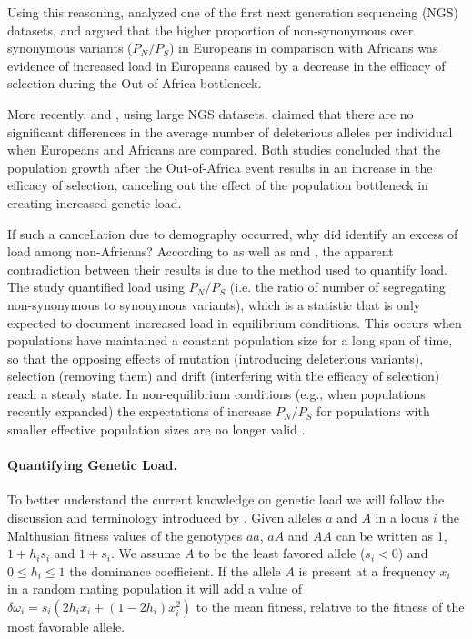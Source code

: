 \documentclass[a4paper, 12pt]{article}
\begin{document}
Using this reasoning, \cite{Lohmueller2008} analyzed one of the first next
generation sequencing (NGS) datasets, and argued that the higher proportion of
non-synonymous over synonymous variants ($P_N/P_S$) in Europeans in comparison
with Africans was evidence of increased load in Europeans caused by a decrease
in the efficacy of selection during the Out-of-Africa bottleneck. 

More recently, \cite{Simons2014} and \cite{Do2015}, using large NGS datasets,
claimed that there are no significant differences in the average number of
deleterious alleles per individual when Europeans and Africans  are compared.
Both studies concluded that the population growth after the Out-of-Africa event
results in an increase in the efficacy of selection, canceling out the effect
of the population bottleneck in creating increased genetic load.

If such a cancellation due to demography occurred, why did
\citep{Lohmueller2008} identify an excess of load among non-Africans?
According to \cite{Koch2017a} as well as \cite{Simons2014} and \cite{Do2015},
the apparent contradiction between their results is due to the method used to
quantify load. The \cite{Lohmueller2008} study quantified load using $P_N/P_S$
(i.e. the ratio of number of segregating non-synonymous to synonymous
variants), which is a statistic that is only expected to document increased
load in equilibrium conditions. This occurs when populations have maintained a
constant population size for a long span of time, so that the opposing effects
of mutation (introducing deleterious variants), selection (removing them) and
drift (interfering with the efficacy of selection) reach a steady state. In
non-equilibrium conditions (e.g., when  populations  recently expanded) the
expectations of increase $P_N/P_S$ for populations with smaller effective
population sizes are no longer valid \citep{Koch2017a}.

\paragraph{Quantifying Genetic Load.} To better understand the current
knowledge on genetic load we will follow the discussion and terminology
introduced by \cite{Gravel2016}. Given alleles $a$ and $A$ in a locus $i$ the
Malthusian fitness values of the genotypes $aa$, $aA$ and $AA$ can be written
as 1, $1 + h_is_i$ and $1 + s_i$.  We assume $A$ to be the least favored allele
($s_i < 0$) and $0 \leq h_i \leq 1$ the dominance coefficient. If the allele
$A$ is present at a frequency $x_i$ in a random mating population  it will add
a value of $\delta \omega_i = s_i (2 h_i x_i + (1 - 2h_i)x_i^2)$ to the mean
fitness, relative to the fitness of the most favorable allele.
\end{document}
